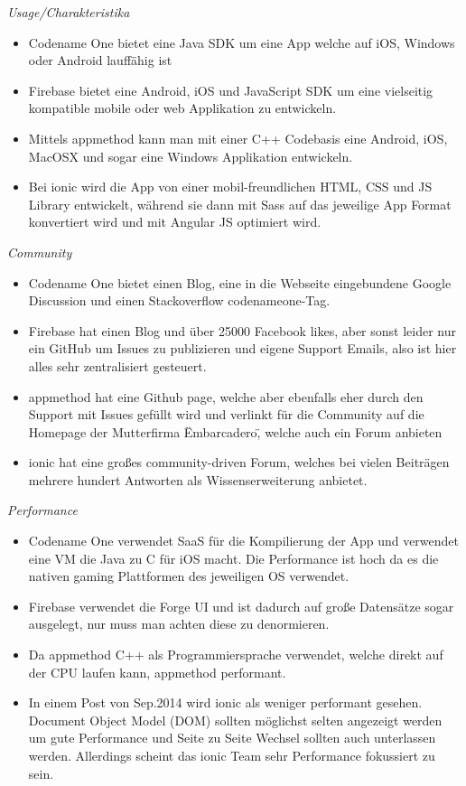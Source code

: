 \textit{Usage/Charakteristika}
\begin{itemize}
\item Codename One bietet eine Java SDK um eine App welche auf iOS, Windows oder Android lauffähig ist
\item Firebase bietet eine Android, iOS und JavaScript SDK um eine vielseitig kompatible mobile oder web Applikation zu entwickeln. 
\item Mittels appmethod kann man mit einer C++ Codebasis eine Android, iOS, MacOSX und sogar eine Windows Applikation entwickeln.
\item Bei ionic wird die App von einer mobil-freundlichen HTML, CSS und JS Library entwickelt, während sie dann mit Sass auf das jeweilige App Format konvertiert wird und mit Angular JS optimiert wird. 
\end{itemize}

\textit{Community}
\begin{itemize}
\item Codename One bietet einen Blog, eine in die Webseite eingebundene Google Discussion und einen Stackoverflow codenameone-Tag.
\item Firebase hat einen Blog und über 25000 Facebook likes, aber sonst leider nur ein GitHub um Issues zu publizieren und eigene Support Emails, also ist hier alles sehr zentralisiert gesteuert. 
\item appmethod hat eine Github page, welche aber ebenfalls eher durch den Support mit Issues gefüllt wird und verlinkt für die Community auf die Homepage der Mutterfirma \"Embarcadero\", welche auch ein Forum anbieten
\item ionic hat eine großes community-driven Forum, welches bei vielen Beiträgen mehrere hundert Antworten als Wissenserweiterung anbietet.
\end{itemize}

\newpage
\textit{Performance}
\begin{itemize}
\item Codename One verwendet SaaS für die Kompilierung der App und verwendet eine VM die Java zu C für iOS macht. Die Performance ist hoch da es die nativen gaming Plattformen des jeweiligen OS verwendet. 
\item Firebase verwendet die Forge UI und ist dadurch auf große Datensätze sogar ausgelegt, nur muss man achten diese zu denormieren.
\item Da appmethod C++ als Programmiersprache verwendet, welche direkt auf der CPU laufen kann, appmethod performant.
\item In einem Post von Sep.2014 wird ionic als weniger performant gesehen. Document Object Model (DOM) sollten möglichst selten angezeigt werden um gute Performance und Seite zu Seite Wechsel sollten auch unterlassen werden. Allerdings scheint das ionic Team sehr Performance fokussiert zu sein.
\end{itemize}

